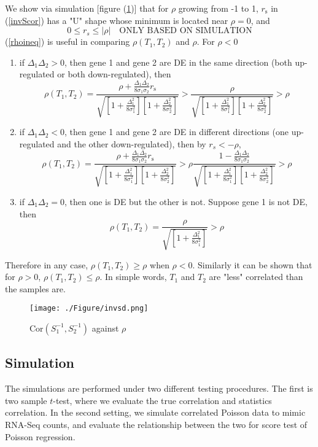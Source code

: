 \documentclass[12pt, a4paper]{article}
\begin{document}
	We show via simulation [figure (\ref{invsd})] that for $\rho$ growing from -1 to 1, $r_{\text{s}}$
	in (\ref{invScor}) has a "U" shape whose minimum is located near $\rho=0$, and  
	\begin{equation}\label{rhoineq}
		0 \leq r_s \leq |\rho| \text{~~ ONLY BASED ON SIMULATION}
	\end{equation}
	(\ref{rhoineq}) is useful in comparing  $\rho({T_1, T_2})$  and $\rho$. 
	For $\rho <0 $
	\begin{enumerate}
		\item if $\Delta_1\Delta_2 >0$, then gene 1 and gene 2 are DE in the same direction (both 
		up-regulated or both down-regulated), then 
		\[\rho(T_1, T_2)= \frac{\rho + \frac{\Delta_1\Delta_2}{8\sigma_1\sigma_2}r_{\text{s}}}{\sqrt{ 
				\left[ 1 + \frac{\Delta_1^2}{8\sigma_1^2}\right]\left[ 1 + \frac{\Delta_2^2}{8\sigma_2^2}\right]}} 
		>\frac{\rho }{\sqrt{  \left[ 1 + \frac{\Delta_1^2}{8\sigma_1^2}\right]\left[ 1 +
				\frac{\Delta_2^2}{8\sigma_2^2}\right]}} >\rho\]
		\item  if $\Delta_1\Delta_2 <0$, then gene 1 and gene 2 are DE in different directions (one
		up-regulated and the other down-regulated), then by $r_s < -\rho$, 
		\[\rho(T_1, T_2)= \frac{\rho + \frac{\Delta_1\Delta_2}{8\sigma_1\sigma_2}r_{\text{s}}}{\sqrt{ 
				\left[ 1 + \frac{\Delta_1^2}{8\sigma_1^2}\right]\left[ 1 + \frac{\Delta_2^2}{8\sigma_2^2}\right]}} 
		>\rho\frac{ 1-\frac{\Delta_1\Delta_2}{8\sigma_1\sigma_2}}{\sqrt{  \left[ 1 +
				\frac{\Delta_1^2}{8\sigma_1^2}\right]\left[ 1 + \frac{\Delta_2^2}{8\sigma_2^2}\right]}} >\rho\]
		\item if  $\Delta_1\Delta_2 =0$, then one is DE but the other is not. Suppose gene 1 is not DE,
		then
		\[\rho(T_1, T_2)= \frac{\rho}{\sqrt{  \left[ 1 + \frac{\Delta_1^2}{8\sigma_1^2}\right]}} >\rho \]
		
	\end{enumerate}
	Therefore in any case, $\rho(T_1, T_2) \geq \rho$ when $\rho <0$. Similarly it can be shown that for
	$\rho >0$, $\rho(T_1, T_2) \leq \rho $. In simple words,  $T_1$ and $T_2$ are "less" correlated than
	the samples are. 
	\begin{figure}[!h]
		\centering
		\caption{$\text{Cor}(S^{-1}_1, S^{-1}_2)$ against $\rho$}
		\texttt{[image: ./Figure/invsd.png]}
		\label{invsd}
	\end{figure}
	
	
	
	\subsection{Simulation}
	The simulations are performed under two different testing procedures. The first is two sample
	$t$-test, where we evaluate the true correlation and statistics correlation.  In the second setting,
	we simulate correlated Poisson data to mimic RNA-Seq counts, and evaluate the relationship between
	the two for score test of Poisson regression. \\
	
\end{document}
